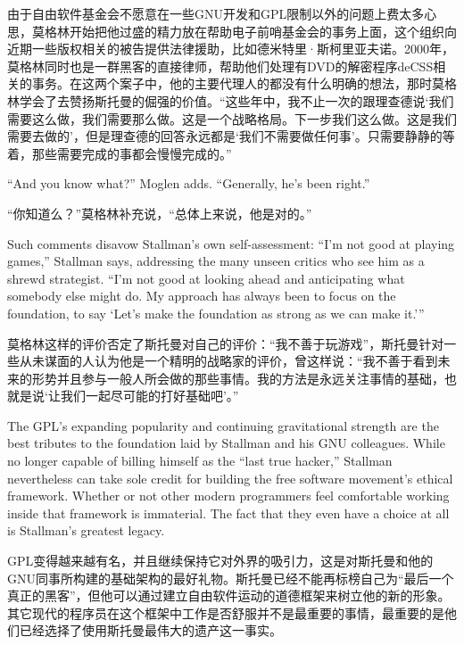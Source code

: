 \ifdefined\chs
由于自由软件基金会不愿意在一些GNU开发和GPL限制以外的问题上费太多心思，莫格林开始把他过盛的精力放在帮助电子前哨基金会的事务上面，这个组织向近期一些版权相关的被告提供法律援助，比如德米特里·斯柯里亚夫诺。2000年，莫格林同时也是一群黑客的直接律师，帮助他们处理有DVD的解密程序deCSS相关的事务。在这两个案子中，他的主要代理人的都没有什么明确的想法，那时莫格林学会了去赞扬斯托曼的倔强的价值。``这些年中，我不止一次的跟理查德说`我们需要这么做，我们需要那么做。这是一个战略格局。下一步我们这么做。这是我们需要去做的'，但是理查德的回答永远都是`我们不需要做任何事'。只需要静静的等着，那些需要完成的事都会慢慢完成的。''

\fi

\ifdefined\eng
``And you know what?'' Moglen adds. ``Generally, he's been right.''
\fi

\ifdefined\chs
``你知道么？''莫格林补充说，``总体上来说，他是对的。''
\fi

\ifdefined\eng
Such comments disavow Stallman's own self-assessment: ``I'm not good at playing games,'' Stallman says, addressing the many unseen critics who see him as a shrewd strategist. ``I'm not good at looking ahead and anticipating what somebody else might do. My approach has always been to focus on the foundation, to say `Let's make the foundation as strong as we can make it.'\hspace{0.01in}''
\fi

\ifdefined\chs
莫格林这样的评价否定了斯托曼对自己的评价：``我不善于玩游戏''，斯托曼针对一些从未谋面的人认为他是一个精明的战略家的评价，曾这样说：``我不善于看到未来的形势并且参与一般人所会做的那些事情。我的方法是永远关注事情的基础，也就是说`让我们一起尽可能的打好基础吧'。''
\fi

\ifdefined\eng
The GPL's expanding popularity and continuing gravitational strength are the best tributes to the foundation laid by Stallman and his GNU colleagues. While no longer capable of billing himself as the ``last true hacker,'' Stallman nevertheless can take sole credit for building the free software movement's ethical framework. Whether or not other modern programmers feel comfortable working inside that framework is immaterial. The fact that they even have a choice at all is Stallman's greatest legacy.
\fi

\ifdefined\chs
GPL变得越来越有名，并且继续保持它对外界的吸引力，这是对斯托曼和他的GNU同事所构建的基础架构的最好礼物。斯托曼已经不能再标榜自己为``最后一个真正的黑客''，但他可以通过建立自由软件运动的道德框架来树立他的新的形象。其它现代的程序员在这个框架中工作是否舒服并不是最重要的事情，最重要的是他们已经选择了使用斯托曼最伟大的遗产这一事实。
\fi

